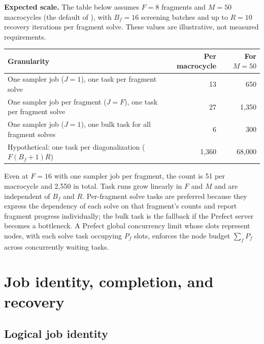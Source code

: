 \documentclass[11pt,a4paper]{article}
\newcommand{\code}[1]{\texttt{\detokenize{#1}}}
\begin{document}
\textbf{Expected scale.} The table below assumes $F = 8$ fragments and
$M = 50$ macrocycles (the default \code{max_cycles} of \code{run_lassqd}), with $B_f = 16$
screening batches and up to $R = 10$ recovery iterations per fragment solve.
These values are illustrative, not measured requirements.
\begin{center}
\small
\begin{tabularx}{\textwidth}{@{}Lrr@{}}
\toprule
Granularity & Per macrocycle & For $M=50$ \\
\midrule
One sampler job ($J=1$), one task per fragment solve & 13 & 650 \\
One sampler job per fragment ($J=F$), one task per fragment solve & 27 & 1{,}350 \\
One sampler job ($J=1$), one bulk task for all fragment solves & 6 & 300 \\
\midrule
Hypothetical: one task per diagonalization ($F (B_f + 1) R$) & 1{,}360 & 68{,}000 \\
\bottomrule
\end{tabularx}
\end{center}
Even at $F = 16$ with one sampler job per fragment, the count is 51 per
macrocycle and 2{,}550 in total. Task runs grow linearly in $F$ and $M$ and are
independent of $B_f$ and $R$. Per-fragment solve tasks are preferred because
they express the dependency of each solve on that fragment's counts and report
fragment progress individually; the bulk task is the fallback if the Prefect
server becomes a bottleneck. A Prefect global concurrency limit whose slots
represent nodes, with each solve task occupying $P_f$ slots, enforces the node
budget $\sum_f P_f$ across concurrently waiting tasks.

\section{Job identity, completion, and recovery}
\label{sec:identity}

\subsection{Logical job identity}
\end{document}
